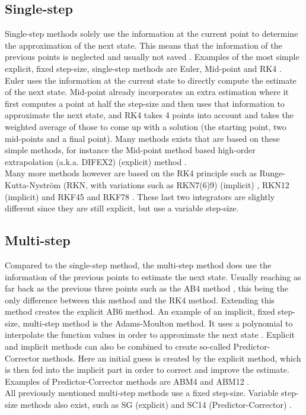 \subsection{Single-step}
\label{subsec:singleStep}
Single-step methods solely use the information at the current point to determine the approximation of the next state. This means that the information of the previous points is neglected and usually not saved \citep{noomen2013int}. Examples of the most simple explicit, fixed step-size, single-step methods are Euler, Mid-point and \ac{RK4} \citep{hofsteenge2013}. Euler uses the information at the current state to directly compute the estimate of the next state. Mid-point already incorporates an extra estimation where it first computes a point at half the step-size and then uses that information to approximate the next state, and \ac{RK4} takes 4 points into account and takes the weighted average of those to come up with a solution (the starting point, two mid-points and a final point). Many methods exists that are based on these simple methods, for instance the Mid-point method based high-order extrapolation (a.k.a. DIFEX2) (explicit) method \citep{deuflhard1994}.\\
Many more methods however are based on the \ac{RK4} principle such as Runge-Kutta-Nystr\"{o}m (RKN, with variations such as RKN7(6)9) (implicit) \citep{montenbruck1992,dormand1987}, \ac{RKN12} (implicit) \citep{montenbruck1992}  and \acf{RKF45} and \acf{RKF78} \citep{fehlberg1969,fehlberg1968}. These last two integrators are slightly different since they are still explicit, but use a variable step-size.


\subsection{Multi-step}
\label{subsec:multiStep}
Compared to the single-step method, the multi-step method does use the information of the previous points to estimate the next state. Usually reaching as far back as the previous three points such as the \ac{AB4} method \citep{noomen2013int}, this being the only difference between this method and the \ac{RK4} method. Extending this method creates the explicit \ac{AB6} method. An example of an implicit, fixed step-size, multi-step method is the Adams-Moulton method. It uses a polynomial to interpolate the function values in order to approximate the next state \citep{noomen2013int}. Explicit and implicit methods can also be combined to create so-called Predictor-Corrector methods. Here an initial guess is created by the explicit method, which is then fed into the implicit part in order to correct and improve the estimate. Examples of Predictor-Corrector methods are \ac{ABM4} and \ac{ABM12} \citep{noomen2013int,montenbruck1992}. \\
All previously mentioned multi-step methods use a fixed step-size. Variable step-size methods also exist, such as \ac{SG} (explicit) \citep{berry2004,meijaard1991} and \ac{SC14} (Predictor-Corrector) \citep{berry2004,ramos2005}.



